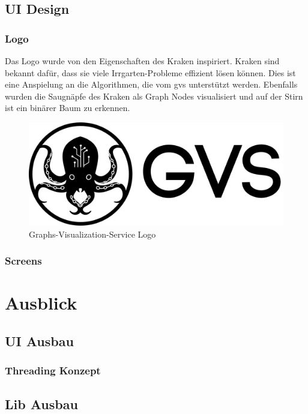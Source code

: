 \documentclass[11pt,a4paper,english,oneside]{book}
\numberwithin{equation}{chapter}
\begin{document}
	\section{UI Design}
	
	\subsection{Logo}
	Das Logo wurde von den Eigenschaften des Kraken \cite{kraken} inspiriert. Kraken sind bekannt dafür, dass sie viele Irrgarten-Probleme effizient lösen können. Dies ist eine Anspielung an die Algorithmen, die vom \gls{gvs} unterstützt werden. Ebenfalls wurden die Saugnäpfe des Kraken als Graph Nodes visualisiert und auf der Stirn ist ein binärer Baum zu erkennen. 
	
	\begin{figure}[h!]
		\centering
		\includegraphics[width=0.5\linewidth]{assets/images/logo}
		\caption[GVS Logo]{Graphs-Visualization-Service Logo}
		\label{fig:logo}
	\end{figure}
	
	\subsection{Screens}
	
	\chapter{Ausblick}
	
	\section{UI Ausbau}
	
	\subsection{Threading Konzept}
	
	\section{Lib Ausbau}
	
\end{document}
